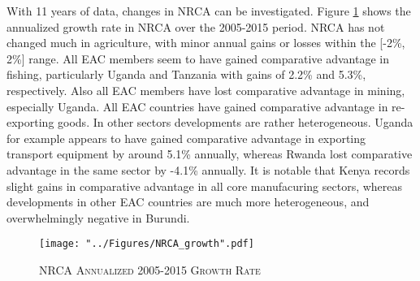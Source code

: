 \documentclass[a4paper]{article}
\begin{document}
With 11 years of data, changes in NRCA can be investigated. Figure \ref{fig:NRCA_growth} shows the annualized growth rate in NRCA over the 2005-2015 period. NRCA has not changed much in agriculture, with minor annual gains or losses within the [-2\%, 2\%] range. All EAC members seem to have gained comparative advantage in fishing, particularly Uganda and Tanzania with gains of 2.2\% and 5.3\%, respectively. Also all EAC members have lost comparative advantage in mining, especially Uganda. All EAC countries have gained comparative advantage in re-exporting goods. In other sectors developments are rather heterogeneous. Uganda for example appears to have gained comparative advantage in exporting transport equipment by around 5.1\% annually, whereas Rwanda lost comparative advantage in the same sector by -4.1\% annually. It is notable that Kenya records slight gains in comparative advantage in all core manufacuring sectors, whereas developments in other EAC countries are much more heterogeneous, and overwhelmingly negative in Burundi.




\begin{figure}[h!]
\centering
\caption{\label{fig:NRCA_growth}\textsc{NRCA Annualized 2005-2015 Growth Rate}}
\texttt{[image: "../Figures/NRCA\_growth".pdf]} %
\end{figure}
\FloatBarrier

\end{document}
